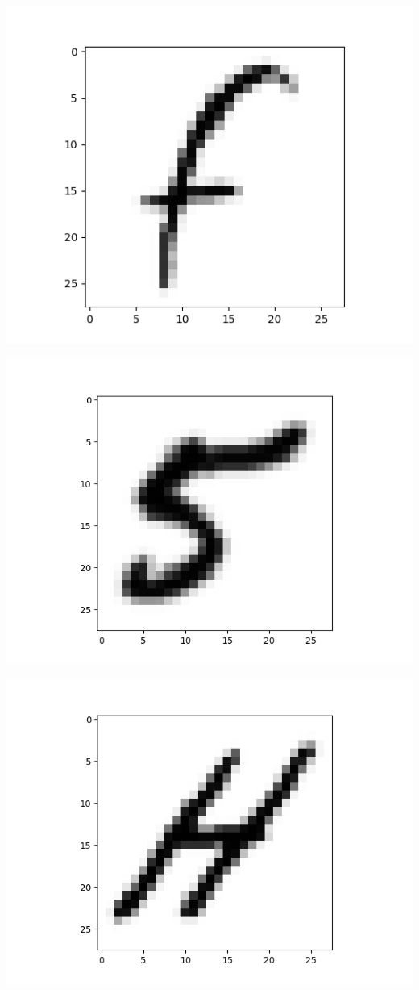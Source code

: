 \documentclass[11pt]{article}
\makeatletter
\def\maxwidth{\ifdim\Gin@nat@width>\linewidth\linewidth
    \else\Gin@nat@width\fi}
\let\Oldincludegraphics\includegraphics
\renewcommand{\includegraphics}[1]{\Oldincludegraphics[width=.8\maxwidth]{#1}}
\makeatother
\begin{document}
\includegraphics{imgs/B2.png}

\includegraphics{imgs/B3.png}

\includegraphics{imgs/B4.png}
\end{document}
